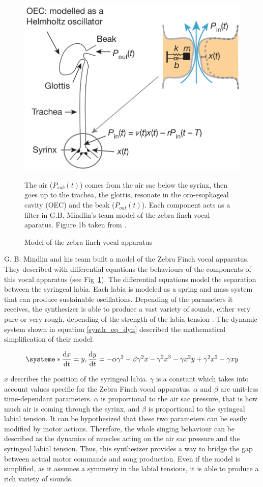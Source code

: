 \documentclass{report}
\begin{document}
\begin{figure}[htbp]
  {\center
  \includegraphics[width=0.5\linewidth]{media/scheme_vocal_apparatus}
  \caption{Model of the zebra finch vocal apparatus\label{zf-vocal-aparatus}}}
  \small

  The air (\(P_{sub}(t)\)) comes from the air sac below the syrinx, then goes up
  to the trachea, the glottis, resonate in the oro-esophageal cavity (OEC) and
  the beak (\(P_{out}(t)\)). Each component acts as a filter in G.B. Mindlin's
  team model of the zebra finch vocal aparatus. Figure 1b taken from
  \textcite{amador_elemental_2013}.

\end{figure}

G. B. Mindlin and his team built a model of the Zebra Finch vocal apparatus.
They described with differential equations the behaviours of the components of
this vocal apparatus (see Fig~\ref{zf-vocal-aparatus}). The differential
equations model the separation between the syringeal labia. Each labia is
modeled as a spring and mass system that can produce sustainable oscillations.
Depending of the parameters it receives, the synthesizer is able to produce a
vast variety of sounds, either very pure or very rough, depending of the
strength of the labia tension \parencite{amador_beyond_2008,
boari_automatic_2015}. The dynamic system shown in equation \ref{synth_eq_dyn}
described the mathematical simplification of their model.

\begin{equation}
\systeme*{
\dv{x}{t} = y,
\dv{y}{t} = - \alpha \gamma^2 - \beta \gamma^2 x - \gamma^2 x^3 - \gamma x^2 y
    + \gamma^2 x^2 - \gamma x y
}
\label{synth_eq_dyn}
\end{equation}

\(x\) describes the position of the syringeal labia. \(\gamma\) is a constant
which takes into account values specific for the Zebra Finch vocal apparatus.
\(\alpha\) and \(\beta\) are unit-less time-dependant parameters. \(\alpha\) is
proportional to the air sac pressure, that is how much air is coming through the
syrinx, and \(\beta\) is proportional to the syringeal labial tension. It can be
hypothesized that these two parameters can be easily modified by motor actions.
Therefore, the whole singing behaviour can be described as the dynamics of
muscles acting on the air sac pressure and the syringeal labial tension. Thus,
this synthesizer provides a way to bridge the gap between actual motor commands
and song production. Even if the model is simplified, as it assumes a symmetry
in the labial tensions, it is able to produce a rich variety of sounds.
\end{document}
